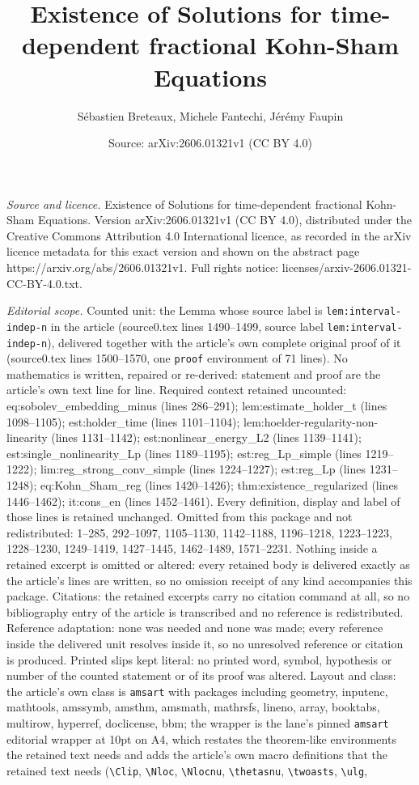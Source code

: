 \documentclass[10pt,a4paper]{amsart}
\title[Existence of Solutions for time-dependent fractional Kohn-Sh]{Existence of Solutions for time-dependent fractional Kohn-Sham Equations}
\author{S\'ebastien Breteaux, Michele Fantechi, J\'er\'emy Faupin}
\date{Source: arXiv:2606.01321v1 (CC BY 4.0)}
\begin{document}
\maketitle

\noindent\emph{Source and licence.} Existence of Solutions for time-dependent fractional Kohn-Sham Equations. Version arXiv:2606.01321v1 (CC BY 4.0), distributed under the Creative Commons Attribution 4.0 International licence, as recorded in the arXiv licence metadata for this exact version and shown on the abstract page https://arxiv.org/abs/2606.01321v1. Full rights notice: licenses/arxiv-2606.01321-CC-BY-4.0.txt.\par\smallskip

\noindent\textit{Editorial scope.} Counted unit: the Lemma whose source label is \texttt{lem:interval-indep-n} in the article (source0.tex lines 1490--1499, source label \texttt{lem:interval-indep-n}), delivered together with the article's own complete original proof of it (source0.tex lines 1500--1570, one \texttt{proof} environment of 71 lines). No mathematics is written, repaired or re-derived: statement and proof are the article's own text line for line. Required context retained uncounted: eq:sobolev\_embedding\_minus (lines 286--291); lem:estimate\_holder\_t (lines 1098--1105); est:holder\_time (lines 1101--1104); lem:hoelder-regularity-non-linearity (lines 1131--1142); est:nonlinear\_energy\_L2 (lines 1139--1141); est:single\_nonlinearity\_Lp (lines 1189--1195); est:reg\_Lp\_simple (lines 1219--1222); lim:reg\_strong\_conv\_simple (lines 1224--1227); est:reg\_Lp (lines 1231--1248); eq:Kohn\_Sham\_reg (lines 1420--1426); thm:existence\_regularized (lines 1446--1462); it:cons\_en (lines 1452--1461). Every definition, display and label of those lines is retained unchanged. Omitted from this package and not redistributed: 1--285, 292--1097, 1105--1130, 1142--1188, 1196--1218, 1223--1223, 1228--1230, 1249--1419, 1427--1445, 1462--1489, 1571--2231. Nothing inside a retained excerpt is omitted or altered: every retained body is delivered exactly as the article's lines are written, so no omission receipt of any kind accompanies this package. Citations: the retained excerpts carry no citation command at all, so no bibliography entry of the article is transcribed and no reference is redistributed. Reference adaptation: none was needed and none was made; every reference inside the delivered unit resolves inside it, so no unresolved reference or citation is produced. Printed slips kept literal: no printed word, symbol, hypothesis or number of the counted statement or of its proof was altered. Layout and class: the article's own class is \texttt{amsart} with packages including geometry, inputenc, mathtools, amssymb, amsthm, amsmath, mathrsfs, lineno, array, booktabs, multirow, hyperref, doclicense, bbm; the wrapper is the lane's pinned \texttt{amsart} editorial wrapper at 10pt on A4, which restates the theorem-like environments the retained text needs and adds the article's own macro definitions that the retained text needs (\texttt{\textbackslash Clip}, \texttt{\textbackslash Nloc}, \texttt{\textbackslash Nlocnu}, \texttt{\textbackslash thetasnu}, \texttt{\textbackslash twoasts}, \texttt{\textbackslash ulg}, 
\end{document}
